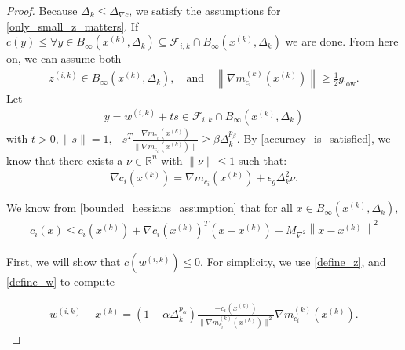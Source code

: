 \documentclass{article}
\theoremstyle{case}
\newcommand{\dk}{\Delta_k}
\newcommand{\fik}{{\mathcal F_{i, k}}}
\newcommand{\gmcik}{{\nabla m_{c_i}^{(k)}\left(\xk\right)}}
\newcommand{\hgik}{{\frac{\nabla m_{c_i}(\xk)}{\|\nabla m_{c_i}(\xk)\|}}}
\newcommand{\maxhessian}{{M_{\nabla^2}}}
\newcommand{\mingraddelta}{{\Delta_{\nabla c}}}
\newcommand{\mingrad}{{ g_{\text{low}} }}
\newcommand{\Rn}{\mathbb R^n}
\newcommand{\tr}{{ B_{\infty}\left(\xk, \dk\right) }}
\newcommand{\wik}{{w^{(i, k)}}}
\newcommand{\xk}{{x^{(k)}}}
\newcommand{\zik}{{z^{(i, k)}}}
\begin{document}
\begin{proof}

Because $\dk \le \mingraddelta$, we satisfy the assumptions for \cref{only_small_z_matters}.
If $c(y) \le \forall y \in \tr \subseteq \fik \cap \tr$ we are done.
From here on, we can assume both
\begin{align}
\zik \in \tr, \quad \textrm{and} \quad \left\|\gmcik\right\| \ge \frac 1 2 \mingrad. \label{z_is_active}
\end{align}
Let
\begin{align}
y = \wik + ts \in \fik \cap \tr \label{t_is_bounded}
\end{align}
with $t > 0, \|s\| = 1, -s^T\hgik \ge \beta \dk^{p_{\beta}}$.
By \cref{accuracy_is_satisfied}, we know that there exists a $\nu\in\Rn$ with $\|\nu\|\le 1$ such that:
\begin{align}
\nabla c_i(\xk) = \nabla m_{c_i}(\xk) + \epsilon_{g}\dk^2\nu. \label{model_error_for_gradient}
\end{align}

We know from \cref{bounded_hessians_assumption} that for all $x \in \tr$,
\begin{align}
c_i(x) \le c_i(\xk) + \nabla c_i(\xk)^T(x - \xk) + \maxhessian \left \|x - \xk \right\|^2 \label{constraint_lower_bound}
\end{align}

First, we will show that $c(\wik) \le 0$.
For simplicity, we use \cref{define_z}, and \cref{define_w} to compute


\begin{align}
\wik - \xk = \left(1 - \alpha \dk^{p_{\alpha} }\right)\frac{-c_i(\xk)}{\|\gmcik\|^2}\gmcik. \label{simple_computation}
\end{align}


\end{proof}
\end{document}
